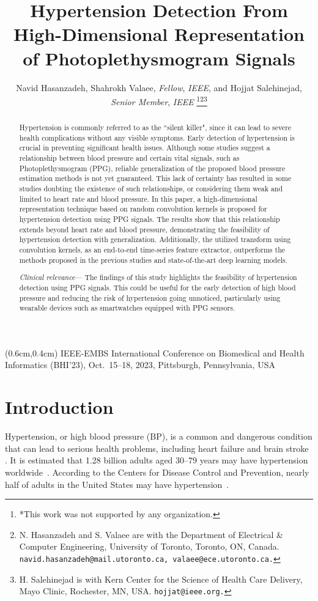\documentclass[letterpaper, 10 pt, conference]{ieeeconf}
\title{\LARGE \bf
Hypertension Detection From High-Dimensional Representation of Photoplethysmogram Signals}
\author{Navid Hasanzadeh, Shahrokh Valaee, \textit{Fellow}, \textit{IEEE}, and Hojjat Salehinejad, \textit{Senior Member}, \textit{IEEE} \thanks{*This work was not supported by any organization.}\thanks{N. Hasanzadeh and S. Valaee are with the Department of Electrical \& Computer Engineering, University of Toronto, Toronto, ON, Canada. {\tt\small  navid.hasanzadeh@mail.utoronto.ca, valaee@ece.utoronto.ca.}}\thanks{H. Salehinejad is with Kern Center for the Science of Health Care Delivery, Mayo Clinic, Rochester, MN, USA. {\tt\small hojjat@ieee.org.}}}
\begin{document}
\begin{textblock*}{20cm}(0.6cm,0.4cm) IEEE-EMBS International Conference on Biomedical and Health Informatics (BHI’23), Oct.\ 15--18, 2023, Pittsburgh, Pennsylvania, USA
\end{textblock*}
\maketitle
\thispagestyle{empty}
\pagestyle{empty}

\begin{abstract}



Hypertension is commonly referred to as the ``silent killer", since it can lead to severe health complications without any visible symptoms. Early detection of hypertension is crucial in preventing significant health issues. Although some studies suggest a relationship between blood pressure and certain vital signals, such as Photoplethysmogram (PPG), reliable generalization of the proposed blood pressure estimation methods is not yet guaranteed. This lack of certainty has resulted in some studies doubting the existence of such relationships, or considering them weak and limited to heart rate and blood pressure. In this paper, a high-dimensional representation technique based on random convolution kernels is proposed for hypertension detection using PPG signals. The results show that this relationship extends beyond heart rate and blood pressure, demonstrating the feasibility of hypertension detection with generalization. Additionally, the utilized transform using convolution kernels, as an end-to-end time-series feature extractor, outperforms the methods proposed in the previous studies and state-of-the-art deep learning models.

\indent \textit{Clinical relevance}— The findings of this study highlights the feasibility of hypertension detection using PPG signals. This could be useful for the early detection of high blood pressure and reducing the risk of hypertension going unnoticed, particularly using wearable devices such as smartwatches equipped with PPG sensors.
\end{abstract}



\section{Introduction}

Hypertension, or high blood pressure (BP), is a common and dangerous condition that can lead to serious health problems, including heart failure and brain stroke \cite{kalehoff2020story}. It is estimated that 1.28 billion adults aged 30–79 years may have hypertension worldwide~\cite{world2022world}. According to the Centers for Disease Control and Prevention, nearly half of adults in the United States may have hypertension~\cite{HypertensionUSA}. 
\end{document}
